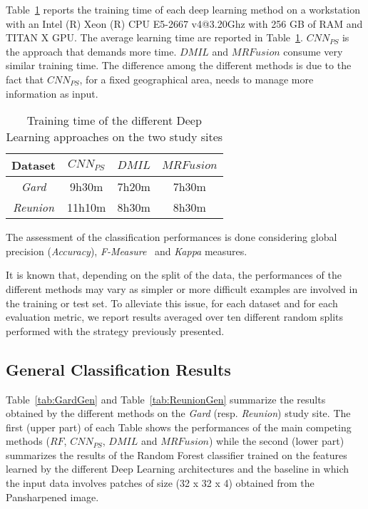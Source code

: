 \documentclass[journal]{IEEEtran}
\newcommand{\method}{$MRFusion$}
\begin{document}
Table~\ref{tab:TrainingTime} reports the training time of each deep learning method on a workstation with an Intel (R) Xeon (R) CPU E5-2667 v4@3.20Ghz with 256 GB of RAM and TITAN X GPU. The average learning time are reported in Table~\ref{tab:TrainingTime}. $CNN_{PS}$ is the approach that demands more time. $DMIL$ and \method{} consume very similar training time. The difference among the different methods is due to the fact that $CNN_{PS}$, for a fixed geographical area, needs to manage more information as input.

\begin{table}[!ht]
\centering
\scriptsize
\begin{tabular}{cccc}
Dataset & $CNN_{PS}$ & $DMIL$ & \method{} \\ \hline \hline
\textit{Gard} & 9h30m & 7h20m & 7h30m \\ \hline
\textit{Reunion} & 11h10m & 8h30m & 8h30m \\ \hline
\end{tabular}
\caption{Training time of the different Deep Learning approaches on the two study sites \label{tab:TrainingTime}}
\end{table}The assessment of the classification performances is done considering global precision (\textit{Accuracy}), \textit{F-Measure}~\cite{IencoGDM17} and \textit{Kappa} measures.

It is known that, depending on the split of the data, the performances of the different methods may vary as simpler or more difficult examples are involved in the training or test set. To alleviate this issue, for each dataset and for each evaluation metric, we report results averaged over ten different random splits performed with the strategy previously presented.

\subsection{General Classification Results}
Table~\ref{tab:GardGen} and Table~\ref{tab:ReunionGen} summarize the results obtained by the different methods on the \textit{Gard} (resp. \textit{Reunion}) study site. The first (upper part) of each Table shows the performances of the main competing methods ($RF$, $CNN_{PS}$, $DMIL$ and \method{}) while the second (lower part) summarizes the results of the Random Forest classifier trained on the features learned by the different Deep Learning architectures and the baseline in which the input data involves patches of size (32 x 32 x 4) obtained from the Pansharpened image. 
\end{document}

